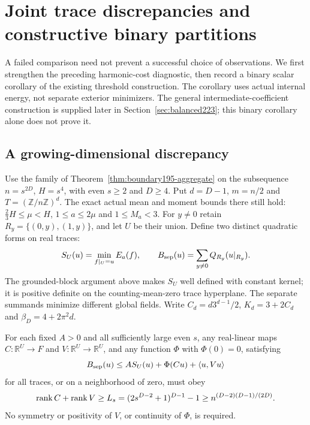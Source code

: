 \section{Joint trace discrepancies and constructive binary partitions}
\label{sec:binary200}
A failed comparison need not prevent a successful choice of observations.
We first strengthen the preceding harmonic-cost diagnostic, then record a
binary scalar corollary of the existing threshold construction.
The corollary uses actual internal energy, not separate exterior
minimizers. The general intermediate-coefficient construction is supplied later in
Section~\ref{sec:balanced223}; this binary corollary alone does not prove it.

\subsection{A growing-dimensional discrepancy}
Use the family of Theorem~\ref{thm:boundary195-aggregate} on the subsequence
$n=s^{2D}$, $H=s^4$, with even $s\ge2$ and $D\ge4$. Put $d=D-1$,
$m=n/2$ and $T=(\mathbb Z/n\mathbb Z)^d$. The exact actual mean and
moment bounds there still hold: $\frac23H\le\mu<H$, $1\le a\le2\mu$
and $1\le M_a<3$.
For $y\ne0$ retain $R_y=\{(0,y),(1,y)\}$, and let $U$ be their union.
Define two distinct quadratic forms on real traces:
\[
 S_U(u)=\min_{f|_U=u}E_a(f),\qquad
 B_{\rm sep}(u)=\sum_{y\ne0}Q_{R_y}(u|_{R_y}).
\]
The grounded-block argument above makes $S_U$ well defined with constant
kernel; it is positive definite on the counting-mean-zero trace hyperplane.
The separate summands minimize different global fields.
Write $C_d=d3^{d-1}/2$, $K_d=3+2C_d$ and $\beta_D=4+2\pi^2d$.
\begin{proposition}\label{prop:jb200-rank}
For each fixed $A>0$ and all sufficiently large even $s$, any real-linear
maps $C:\mathbb R^U\to F$ and $V:\mathbb R^U\to\mathbb R^U$, and any
function $\Phi$ with $\Phi(0)=0$, satisfying
\[
 B_{\rm sep}(u)\le A S_U(u)+\Phi(Cu)+\langle u,Vu\rangle
\]
for all traces, or on a neighborhood of zero, must obey
\[
 \operatorname{rank} C+\operatorname{rank} V\ge L_s=(2s^{D-2}+1)^{D-1}-1
 \ge n^{(D-2)(D-1)/(2D)}.
\]
No symmetry or positivity of $V$, or continuity of $\Phi$, is required.
\end{proposition}
